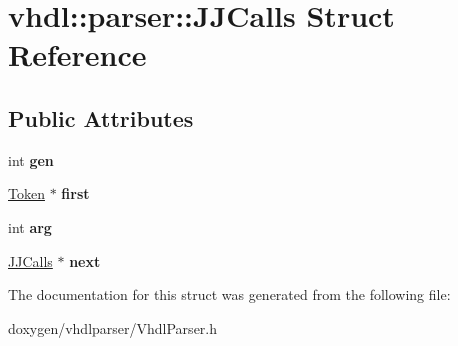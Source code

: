 \hypertarget{structvhdl_1_1parser_1_1_j_j_calls}{}\section{vhdl\+::parser\+::J\+J\+Calls Struct Reference}
\label{structvhdl_1_1parser_1_1_j_j_calls}
\subsection*{Public Attributes}
\begin{DoxyCompactItemize}
\item 
\mbox{\label{structvhdl_1_1parser_1_1_j_j_calls_a5d25b6278ae014a14a0f5be2678f663c}} 
int {\bfseries gen}
\item 
\mbox{\label{structvhdl_1_1parser_1_1_j_j_calls_a0994fa11976ac659180bf73c1068783e}} 
\mbox{\hyperlink{classvhdl_1_1parser_1_1_token}{Token}} $\ast$ {\bfseries first}
\item 
\mbox{\label{structvhdl_1_1parser_1_1_j_j_calls_a952889761822083d0eb8175cc62e6b7f}} 
int {\bfseries arg}
\item 
\mbox{\label{structvhdl_1_1parser_1_1_j_j_calls_a6b6a95b77fab1e71ce05bd43da1b8f67}} 
\mbox{\hyperlink{structvhdl_1_1parser_1_1_j_j_calls}{J\+J\+Calls}} $\ast$ {\bfseries next}
\end{DoxyCompactItemize}


The documentation for this struct was generated from the following file\+:\begin{DoxyCompactItemize}
\item 
doxygen/vhdlparser/Vhdl\+Parser.\+h\end{DoxyCompactItemize}
